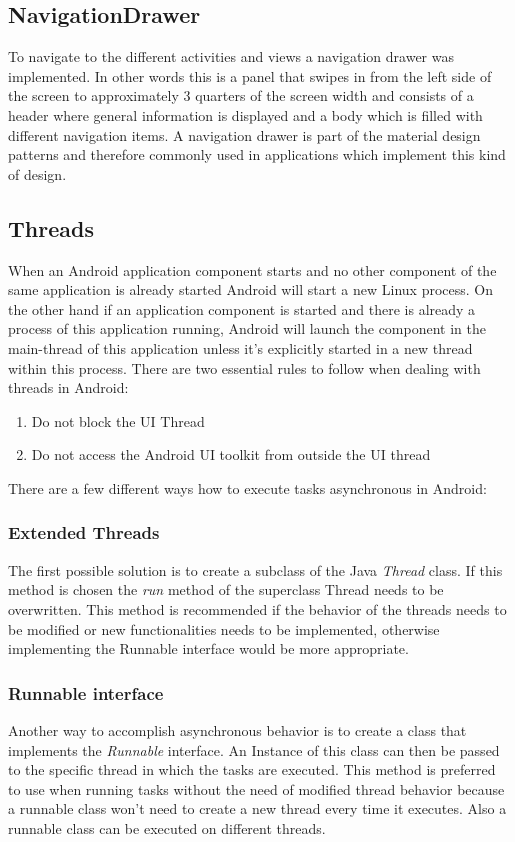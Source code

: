 \subsection{NavigationDrawer}
To navigate to the different activities and views a navigation drawer was implemented. In other words this is a panel that swipes in from the left side of the screen to approximately 3 quarters of the screen width and consists of a header where general information is displayed and a body which is filled with different navigation items. A navigation drawer is part of the material design patterns and therefore commonly used in applications which implement this kind of design.

\subsection{Threads}
When an Android application component starts and no other component of the same application is already started Android will start a new Linux process. On the other hand if an application component is started and there is already a process of this application running, Android will launch the component in the main-thread of this application unless it's explicitly started in a new thread within this process. There are two essential rules to follow when dealing with threads in Android:

\begin{enumerate}
	\item Do not block the UI Thread
	\item Do not access the Android UI toolkit from outside the UI thread
\end{enumerate}

\noindent There are a few different ways how to execute tasks asynchronous in Android:

	\subsubsection{Extended Threads}
	The first possible solution is to create a subclass of the Java \emph{Thread} class. If this method is chosen the \emph{run} method of the superclass Thread needs to be overwritten. This method is recommended if the behavior of the threads needs to be modified or new functionalities needs to be implemented, otherwise implementing the Runnable interface would be more appropriate.

	\subsubsection{Runnable interface}
	Another way to accomplish asynchronous behavior is to create a class that implements the \emph{Runnable} interface. An Instance of this class can then be passed to the specific thread in which the tasks are executed. This method is preferred to use when running tasks without the need of modified thread behavior because a runnable class won't need to create a new thread every time it executes. Also a runnable class can be executed on different threads.

